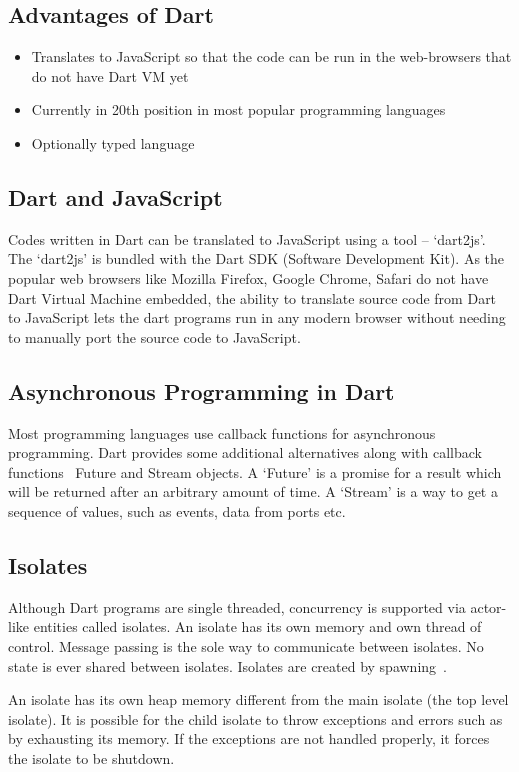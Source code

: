   \subsection{Advantages of Dart}
  \begin{itemize}
    \item Translates to JavaScript so that the code can be run in the web-browsers that do not have Dart VM yet
    \item Currently in 20th position in most popular programming languages
    \item Optionally typed language
\end{itemize}

  \subsection{Dart and JavaScript}
  Codes written in Dart can be translated to JavaScript using a tool – ‘dart2js’. The ‘dart2js’ is bundled with the Dart SDK (Software Development Kit).  As the popular web browsers like Mozilla Firefox, Google Chrome, Safari do not have Dart Virtual Machine embedded, the ability to translate source code from Dart to JavaScript lets the dart programs run in any modern browser without needing to manually port the source code to JavaScript.

  \subsection{Asynchronous Programming in Dart}
  Most programming languages use callback functions for asynchronous programming. Dart provides some additional alternatives along with callback functions \textendash~Future and Stream objects. A ‘Future’ is a promise for a result which will be returned after an arbitrary amount of time. A ‘Stream’ is a way to get a sequence of values, such as events, data from ports etc.

  \subsection{Isolates}
  \label{sec:isolates}
  Although Dart programs are single threaded, concurrency is supported via actor-like entities called isolates. An isolate has its own memory and own thread of control. Message passing is the sole way to communicate between isolates. No state is ever shared between isolates. Isolates are created by spawning~\cite{dartEcma}.

  An isolate has its own heap memory different from the main isolate (the top level isolate). It is possible for the child isolate to throw exceptions and errors such as by exhausting its memory. If the exceptions are not handled properly, it forces the isolate to be shutdown.

